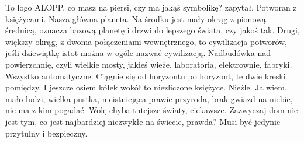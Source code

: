 \begin{dialogue}
\ds{} To logo ALOPP, co masz na piersi, czy ma jakąś symbolikę? \dm{} zapytał.
\ds{} Potworan z księżycami. Nasza główna planeta.
Na środku jest mały okrąg z pionową średnicą, oznacza bazową planetę i drzwi do lepszego świata, czy jakoś tak.
Drugi, większy okrąg, z dwoma połączeniami wewnętrznego, to cywilizacja potworów, jeśli dziewiątkę istot można w ogóle nazwać cywilizacją.
Nadbudówka nad powierzchnię, czyli wielkie mosty, jakieś wieże, laboratoria, elektrownie, fabryki. Wszystko automatyczne. Ciągnie się od horyzontu po horyzont, te dwie kreski pomiędzy.
I jeszcze osiem kółek wokół to niezliczone księżyce.
\ds{} Nieźle.
\ds{} Ja wiem, mało ludzi, wielka pustka, nieistniejąca prawie przyroda, brak gwiazd na niebie, nie ma z kim pogadać. Wolę chyba tutejsze światy, ciekawsze.
\ds{} Zazwyczaj dom nie jest tym, co jest najbardziej niezwykłe na świecie, prawda? Musi być jedynie przytulny i bezpieczny.
\end{dialogue}

